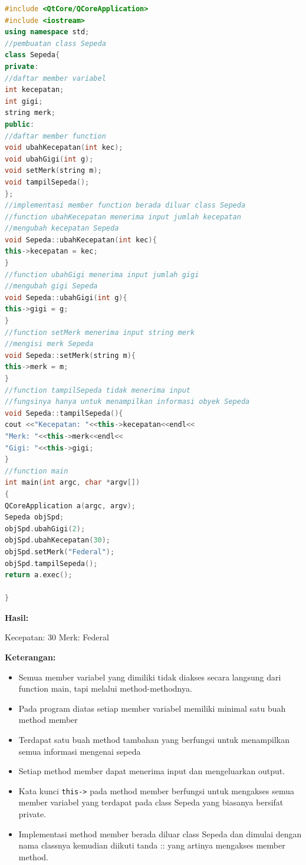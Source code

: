 \begin{lstlisting}[language=c++, caption=Member function dan implementasinya, label=contoh6-6]
#include <QtCore/QCoreApplication>
#include <iostream>
using namespace std;
//pembuatan class Sepeda
class Sepeda{
private:
//daftar member variabel
int kecepatan;
int gigi;
string merk;
public:
//daftar member function
void ubahKecepatan(int kec);
void ubahGigi(int g);
void setMerk(string m);
void tampilSepeda();
};
//implementasi member function berada diluar class Sepeda
//function ubahKecepatan menerima input jumlah kecepatan
//mengubah kecepatan Sepeda
void Sepeda::ubahKecepatan(int kec){
this->kecepatan = kec;
}
//function ubahGigi menerima input jumlah gigi
//mengubah gigi Sepeda
void Sepeda::ubahGigi(int g){
this->gigi = g;
}
//function setMerk menerima input string merk
//mengisi merk Sepeda
void Sepeda::setMerk(string m){
this->merk = m;
}
//function tampilSepeda tidak menerima input
//fungsinya hanya untuk menampilkan informasi obyek Sepeda
void Sepeda::tampilSepeda(){
cout <<"Kecepatan: "<<this->kecepatan<<endl<<
"Merk: "<<this->merk<<endl<<
"Gigi: "<<this->gigi;
}
//function main
int main(int argc, char *argv[])
{
QCoreApplication a(argc, argv);
Sepeda objSpd;
objSpd.ubahGigi(2);
objSpd.ubahKecepatan(30);
objSpd.setMerk("Federal");
objSpd.tampilSepeda();
return a.exec();

}
\end{lstlisting}

\textbf{Hasil:}
\begin{lcverbatim}
Kecepatan: 30
Merk: Federal
\end{lcverbatim}


\textbf{Keterangan:}

\begin{itemize}

\item
  Semua member variabel yang dimiliki tidak diakses secara langsung dari
  function main, tapi melalui method-methodnya.
\item
  Pada program diatas setiap member variabel memiliki minimal satu buah
  method member
\item
  Terdapat satu buah method tambahan yang berfungsi untuk menampilkan
  semua informasi mengenai sepeda
\item
  Setiap method member dapat menerima input dan mengeluarkan output.
\item
  Kata kunci \texttt{this-\textgreater{}} pada method member berfungsi
  untuk mengakses semua member variabel yang terdapat pada class Sepeda
  yang biasanya bersifat private.
\item
  Implementasi method member berada diluar class Sepeda dan dimulai
  dengan nama classnya kemudian diikuti tanda :: yang artinya mengakses
  member method.
\end{itemize}

